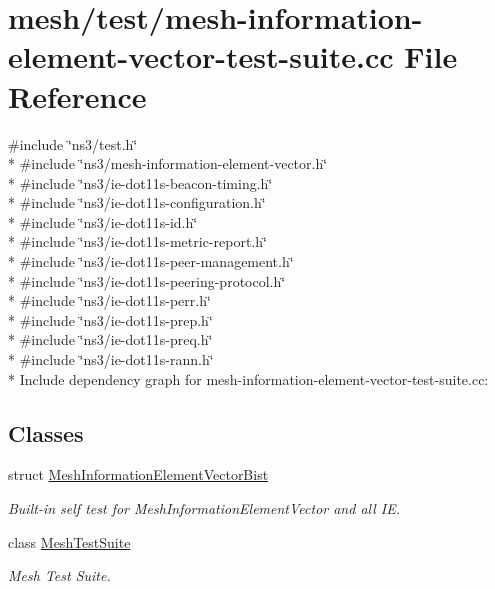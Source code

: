 \hypertarget{mesh-information-element-vector-test-suite_8cc}{}\section{mesh/test/mesh-\/information-\/element-\/vector-\/test-\/suite.cc File Reference}
\label{mesh-information-element-vector-test-suite_8cc}
{\ttfamily \#include \char`\"{}ns3/test.\+h\char`\"{}}\\*
{\ttfamily \#include \char`\"{}ns3/mesh-\/information-\/element-\/vector.\+h\char`\"{}}\\*
{\ttfamily \#include \char`\"{}ns3/ie-\/dot11s-\/beacon-\/timing.\+h\char`\"{}}\\*
{\ttfamily \#include \char`\"{}ns3/ie-\/dot11s-\/configuration.\+h\char`\"{}}\\*
{\ttfamily \#include \char`\"{}ns3/ie-\/dot11s-\/id.\+h\char`\"{}}\\*
{\ttfamily \#include \char`\"{}ns3/ie-\/dot11s-\/metric-\/report.\+h\char`\"{}}\\*
{\ttfamily \#include \char`\"{}ns3/ie-\/dot11s-\/peer-\/management.\+h\char`\"{}}\\*
{\ttfamily \#include \char`\"{}ns3/ie-\/dot11s-\/peering-\/protocol.\+h\char`\"{}}\\*
{\ttfamily \#include \char`\"{}ns3/ie-\/dot11s-\/perr.\+h\char`\"{}}\\*
{\ttfamily \#include \char`\"{}ns3/ie-\/dot11s-\/prep.\+h\char`\"{}}\\*
{\ttfamily \#include \char`\"{}ns3/ie-\/dot11s-\/preq.\+h\char`\"{}}\\*
{\ttfamily \#include \char`\"{}ns3/ie-\/dot11s-\/rann.\+h\char`\"{}}\\*
Include dependency graph for mesh-\/information-\/element-\/vector-\/test-\/suite.cc\+:
\subsection*{Classes}
\begin{DoxyCompactItemize}
\item 
struct \hyperlink{structMeshInformationElementVectorBist}{Mesh\+Information\+Element\+Vector\+Bist}
\begin{DoxyCompactList}\small\item\em Built-\/in self test for Mesh\+Information\+Element\+Vector and all IE. \end{DoxyCompactList}\item 
class \hyperlink{classMeshTestSuite}{Mesh\+Test\+Suite}
\begin{DoxyCompactList}\small\item\em Mesh Test Suite. \end{DoxyCompactList}\end{DoxyCompactItemize}
